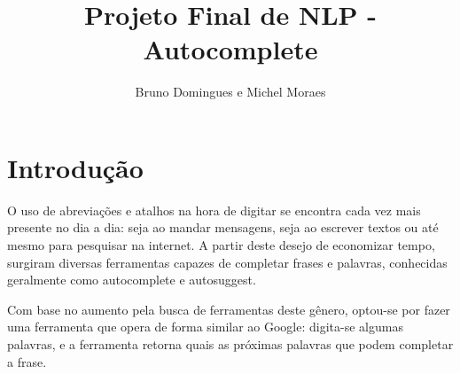 \documentclass[a4paper,11pt,final]{article}
\title{Projeto Final de NLP - Autocomplete}
\author{Bruno Domingues e Michel Moraes}
\begin{document}
\maketitle

\section{Introdução}

O uso de abreviações e atalhos na hora de digitar se encontra cada vez mais presente no dia a dia: seja ao mandar mensagens, seja ao escrever textos ou até mesmo para pesquisar na internet.
A partir deste desejo de economizar tempo, surgiram diversas ferramentas capazes de completar frases e palavras, conhecidas geralmente como autocomplete e autosuggest.

Com base no aumento pela busca de ferramentas deste gênero, optou-se por fazer uma ferramenta que opera de forma similar ao Google: digita-se algumas palavras, e a ferramenta retorna quais as próximas palavras que podem completar a frase.
\end{document}
